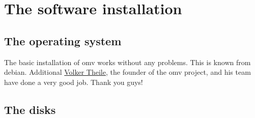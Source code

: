 

\section{The software installation}

\subsection{The operating system}

The basic installation of \gls{omv} works without any problems. This is known
from debian. Additional \href{https://www.openmediavault.org/?page_id=1206}{Volker Theile},
the founder of the \gls{omv} project, and his team have done a very good job.
Thank you guys!


\subsection{The disks}


